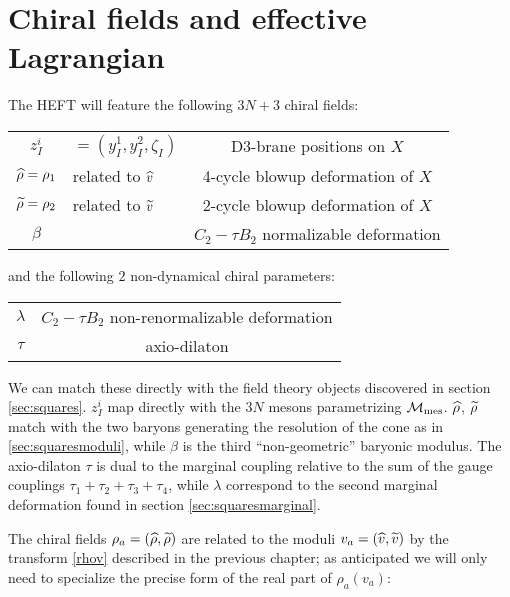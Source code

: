 \section{Chiral fields and effective Lagrangian}

The HEFT will feature the following $3N + 3$ chiral fields:

\begin{center}\begin{tabular}{c | l c}
	$z_I^i$ & $= (y_I^1, y_I^2, \zeta_I)$ & D3-brane positions on $X$\\
	$\widehat{\rho} = \rho_1$ & related to $\widehat{v}$ & 4-cycle blowup deformation of $X$\\
	$\widetilde{\rho} = \rho_2$ & related to $\widetilde{v}$ & 2-cycle blowup deformation of $X$\\
	$\beta$ &  & $C_2 - \tau B_2$ normalizable deformation
\end{tabular}\end{center}


and the following $2$ non-dynamical chiral parameters:

\begin{center}
\begin{tabular}{c | c}
	$\lambda$ &  $C_2 - \tau B_2$ non-renormalizable deformation\\
	$\tau$ &  axio-dilaton
\end{tabular}\end{center}

We can match these directly with the field theory objects discovered in section \ref{sec:squares}. $z_I^i$ map directly with the $3N$ mesons parametrizing $\mathcal{M}_\mathrm{mes}$. $\widehat{\rho}$, $\widetilde{\rho}$ match with the two baryons generating the resolution of the cone as in \ref{sec:squaresmoduli}, while $\beta$ is the third ``non-geometric'' baryonic modulus. The axio-dilaton $\tau$ is dual to the marginal coupling relative to the sum of the gauge couplings $\tau_1 + \tau_2 + \tau_3 + \tau_4$, while $\lambda$ correspond to the second marginal deformation found in section \ref{sec:squaresmarginal}.

The chiral fields $\rho_a = (\widehat{\rho},\widetilde{\rho})$ are related to the moduli $v_a = (\widehat{v}, \widetilde{v})$ by the transform \eqref{rhov} described in the previous chapter; as anticipated we will only need to specialize the precise form of the real part of $\rho_a(v_a)$:

